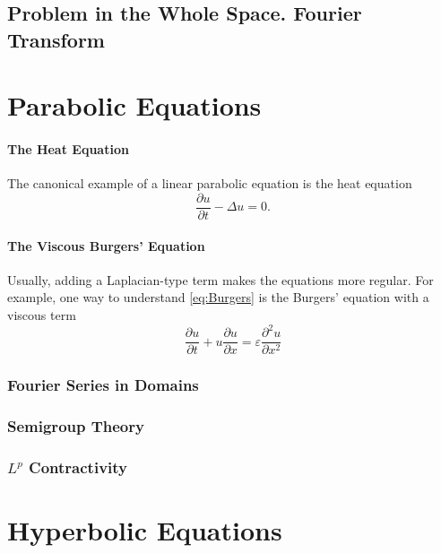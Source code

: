\subsection{Problem in the Whole Space. Fourier Transform}


\section{Parabolic Equations}

\paragraph{The Heat Equation}
The canonical example of a linear parabolic equation is the heat equation
\begin{equation}
    \label{eq:calor}
    \frac{\partial u}{\partial t} -\Delta u = 0.
\end{equation}

\paragraph{The Viscous Burgers' Equation}
Usually, adding a Laplacian-type term makes the equations more regular. For example, one way to understand \eqref{eq:Burgers} is the Burgers' equation with a viscous term
\begin{equation}
    \label{eq:Burgers viscosa}
    \frac{\partial u}{\partial t} + u\frac{\partial u}{\partial x} = \varepsilon \frac{\partial^2 u}{\partial x^2}
\end{equation}

\subsubsection{Fourier Series in Domains}

\subsubsection{Semigroup Theory}

\subsubsection{$L^p$ Contractivity}

\section{Hyperbolic Equations}

